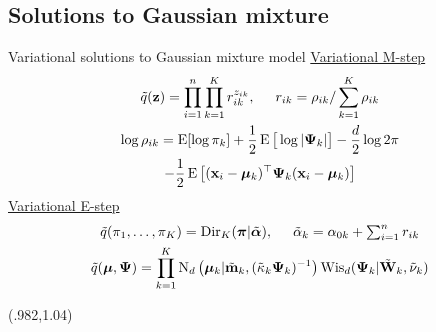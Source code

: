\subsection{Solutions to Gaussian mixture}

\begin{frame}[label=vigmmsoln]{Variational solutions to Gaussian mixture model}
  \underline{Variational M-step}
  \begin{align*}
  \begin{gathered}
    \tilde q(\bz) = \prod_{i=1}^n\prod_{k=1}^K r_{ik}^{z_{ik}}, \hspace{0.5cm} r_{ik} = \rho_{ik} / \sum_{k=1}^K \rho_{ik} \\
    \log \rho_{ik} = \E[\log\pi_k] + \half \E\big[\log|\bPsi_k|\big] - \half[d]\log 2\pi \\
    - \half \E \left[(\bx_i - \bmu_k)^\top \bPsi_k (\bx_i - \bmu_k)  \right]
  \end{gathered} 
  \end{align*}
  \underline{Variational E-step}
  \begin{align*}
  \begin{gathered}
    \tilde q(\pi_1,\dots,\pi_K) = \Dir_K(\bpi | \tilde\balpha),  \hspace{0.5cm}  \tilde\alpha_k = \alpha_{0k} + \textstyle\sum_{i=1}^n r_{ik} \\
    \tilde q(\bmu,\bPsi) = \prod_{k=1}^K \N_d\big(\bmu_k|\tilde\bmm_k, (\tilde\kappa_{k}\bPsi_k)^{-1}\big)\Wis_d(\bPsi_k|\tilde\bW_k,\tilde\nu_k)
  \end{gathered} 
  \end{align*}
  
  \begin{textblock*}{3cm}(.982\textwidth,1.04\textheight)%
    \hyperlink{vigmm}{}      
  \end{textblock*} 
\end{frame}

